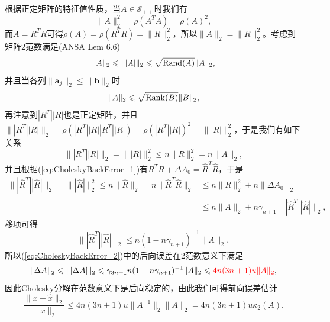 \documentclass[a4paper,10pt]{ctexart}
\begin{document}
根据正定矩阵的特征值性质，当$ A\in \mathcal{S}_{++} $时我们有
\[
    \| A \|_2^2 = \rho(A^TA) = \rho(A)^2,
\]
而$ A=R^TR $可得$ \rho(A) = \rho(R^TR) = \| R \|_2^2 $，所以$ \| A \|_2 = \| R \|_2^2 $。考虑到矩阵2范数满足(ANSA Lem 6.6)
\begin{equation}
    \| A \|_2 \leqslant \| |A| \|_2 \leqslant \sqrt{{\rm Rand}(A)} \| A \|_2,
\end{equation}
并且当各列$ \| \bm{a}_j \|_2\leqslant \| \bm{b} \|_2 $时
\begin{equation}
    \| A \|_2 \leqslant \sqrt{{\rm Rank}(B)} \| B \|_2,
\end{equation}
再注意到$ |R^T| |R| $也是正定矩阵，并且$ \| |R^T| |R| \|_2 = \rho(|R^T| |R||R^T| |R|) = \rho(|R^T| |R|)^2 = \| |R| \|_2^2  $，于是我们有如下关系
\begin{equation}
    \| |R^T| |R| \|_2 = \| |R| \|_2^2 \leqslant n \| R \|_2^2 = n \| A \|_2,
\end{equation}
并且根据(\ref{eq:CholeskyBackError_1})有$ R^TR + \Delta A_0 = \hat{R}^T \hat{R} $，于是
\begin{equation}\label{eq:norm2}
    \begin{aligned}
        \| |\hat{R}^T| |\hat{R}| \|_2 = \| |\hat{R}| \|_2^2 \leqslant n \| \hat{R} \|_2=n\| \hat{R}^T\hat{R} \|_2 
        &\leqslant n \| R \|_2^2 + n \| \Delta A_0 \|_2 \\
        &\leqslant n \| A \|_2 + n \gamma_{n+1} \| |\hat{R}^T| |\hat{R}| \|_2,
    \end{aligned}
\end{equation}
移项可得
\begin{equation}
    \| |\hat{R}^T| |\hat{R}| \|_2 \leqslant n(1-n\gamma_{n+1})^{-1} \| A \|_2,
\end{equation}
所以(\ref{eq:CholeskyBackError_2})中的后向误差在2范数意义下满足
\begin{equation}
    \| \Delta A \|_2 \leqslant \| |\Delta A| \|_2 \leqslant \gamma_{3n+1}n(1-n \gamma_{n+1})^{-1}\| A \|_2 \leqslant \textcolor{red}{4n(3n+1)u \| A \|_2},
\end{equation}
因此Cholesky分解在范数意义下是后向稳定的，由此我们可得前向误差估计
\begin{equation}
    \frac{\| x-\hat{x}\|_2}{\| x \|_2} \leqslant 4n(3n+1)u\| A^{-1} \|_2 \| A \|_2=4n(3n+1)u \kappa_2(A).
\end{equation}
\end{document}
